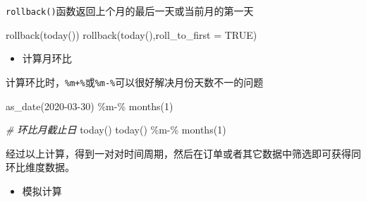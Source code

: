\documentclass[
]{book}
\newenvironment{Shaded}{\begin{snugshade}}{\end{snugshade}}
\newcommand{\AttributeTok}[1]{\textcolor[rgb]{0.77,0.63,0.00}{#1}}
\newcommand{\CommentTok}[1]{\textcolor[rgb]{0.56,0.35,0.01}{\textit{#1}}}
\newcommand{\ConstantTok}[1]{\textcolor[rgb]{0.00,0.00,0.00}{#1}}
\newcommand{\DecValTok}[1]{\textcolor[rgb]{0.00,0.00,0.81}{#1}}
\newcommand{\FunctionTok}[1]{\textcolor[rgb]{0.00,0.00,0.00}{#1}}
\newcommand{\NormalTok}[1]{#1}
\newcommand{\SpecialCharTok}[1]{\textcolor[rgb]{0.00,0.00,0.00}{#1}}
\newcommand{\StringTok}[1]{\textcolor[rgb]{0.31,0.60,0.02}{#1}}
\providecommand{\tightlist}{%
  \setlength{\itemsep}{0pt}\setlength{\parskip}{0pt}}
\begin{document}
\texttt{rollback()}函数返回上个月的最后一天或当前月的第一天

\begin{Shaded}
\begin{Highlighting}[]
\FunctionTok{rollback}\NormalTok{(}\FunctionTok{today}\NormalTok{())}
\FunctionTok{rollback}\NormalTok{(}\FunctionTok{today}\NormalTok{(),}\AttributeTok{roll\_to\_first =} \ConstantTok{TRUE}\NormalTok{)}
\end{Highlighting}
\end{Shaded}

\begin{itemize}
\tightlist
\item
  计算月环比
\end{itemize}

计算环比时，\texttt{\%m+\%}或\texttt{\%m-\%}可以很好解决月份天数不一的问题

\begin{Shaded}
\begin{Highlighting}[]
\FunctionTok{as\_date}\NormalTok{(}\StringTok{\textquotesingle{}2020{-}03{-}30\textquotesingle{}}\NormalTok{) }\SpecialCharTok{\%m{-}\%} \FunctionTok{months}\NormalTok{(}\DecValTok{1}\NormalTok{)}

\CommentTok{\# 环比月截止日}
\FunctionTok{today}\NormalTok{()}
\FunctionTok{today}\NormalTok{() }\SpecialCharTok{\%m{-}\%} \FunctionTok{months}\NormalTok{(}\DecValTok{1}\NormalTok{)}
\end{Highlighting}
\end{Shaded}

经过以上计算，得到一对对时间周期，然后在订单或者其它数据中筛选即可获得同环比维度数据。

\begin{itemize}
\tightlist
\item
  模拟计算
\end{itemize}
\end{document}
